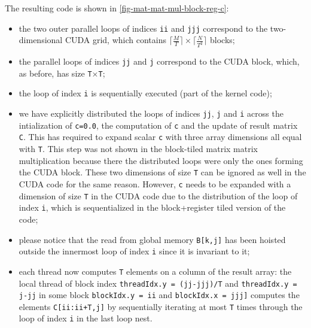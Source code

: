 \documentclass[acmsmall,review]{acmart}\settopmatter{printfolios=true,printccs=false,printacmref=false}
\begin{document}
The resulting code is shown in \cref{fig-mat-mat-mul-block-reg-c}: 
\begin{itemize}
    \item the two outer parallel loops of indices {\tt ii} and {\tt jjj} correspond
        to the two-dimensional CUDA grid, which contains 
        $\lceil\frac{M}{T}\rceil\times\lceil\frac{N}{T^2}\rceil$ blocks;
    \item the parallel loops of indices {\tt jj} and {\tt j} correspond to
        the CUDA block, which, as before, has size {\tt T$\times$T};
    \item the loop of index {\tt i} is sequentially executed 
            (part of the kernel code);
    \item we have explicitly distributed the loops of indices {\tt jj}, 
        {\tt j} and {\tt i} across the intialization of {\tt c=0.0},
        the computation of {\tt c} and the update of result matrix {\tt C}.
        This has required to expand scalar {\tt c} with three array dimensions
        all equal with {\tt T}. This step was not shown in the block-tiled
        matrix matrix multiplication because there the distributed loops
        were only the ones forming the CUDA block.  These two dimensions
        of size {\tt T} can be ignored as well in the CUDA code for the
        same reason. However, {\tt c} needs to be expanded with a dimension
        of size {\tt T} in the CUDA code due to the distribution of the loop
        of index {\tt i}, which is sequentialized in the block+register tiled
        version of the code;
    \item please notice that the read from global memory {\tt B[k,j]} has
        been hoisted outside the innermost loop of index {\tt i} since it
        is invariant to it;
    \item each thread now computes {\tt T} elements on a column of the result array: 
        the local thread of block index {\tt threadIdx.y = (jj-jjj)/T} and 
        {\tt threadIdx.y = j-jj} in some block {\tt blockIdx.y = ii} and 
        {\tt blockIdx.x = jjj]} computes the elements {\tt C[ii:ii+T,j]}
        by sequentially iterating at most {\tt T} times through the
        loop of index {\tt i} in the last loop nest.
\end{itemize}
\end{document}
